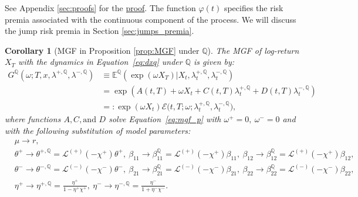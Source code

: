 \documentclass[11pt,a4paper]{article}
\numberwithin{equation}{section}
\newtheorem{corollary}[theorem]{Corollary}
\theoremstyle{remark}
\theoremstyle{definition}
\newcommand{\E}{{\mathbb{E}}}
\newcommand{\q}{{\mathbb Q}}
\newcommand{\lQp}{\lambda^{+,\q}}
\newcommand{\lQm}{\lambda^{-,\q}}
\newcommand{\Ec}{\mathcal{E}}
\begin{document}
See Appendix \ref{sec:proofs} for the \hyperref[proof:prop:risk-neutralisation]{proof}.
The function $\varphi(t)$ specifies the risk premia associated with the continuous component of the process. We will discuss the jump risk premia in Section \ref{sec:jumps_premia}.

\begin{corollary}[MGF in Proposition \ref{prop:MGF} under $\mathbb{Q}$] \label{prop:MGF_q}
    The MGF of log-return $X_T$ with the dynamics in Equation~\eqref{eq:dxq} under $\mathbb{Q}$ is given by:
    \begin{equation}\label{eq:mgf_q}
    \begin{split}
        G^{\mathbb{Q}}(\omega;T,x,\lambda^{+, \mathbb{Q}}, \lambda^{-, \mathbb{Q}}) & \equiv\E^{\mathbb{Q}}\left(\exp(\omega X_T)\big|X_t, \lambda^{+, \mathbb{Q}}_t, \lambda^{-, \mathbb{Q}}_t\right)\\
        & = \exp\left(A(t,T)+ \omega X_t + C(t,T)\lambda_t^{+, \mathbb{Q}} + D(t,T)\lambda_t^{-, \mathbb{Q}}\right)\\
        & =: \exp\left(\omega X_t \right)\Ec\big(t,T;\omega;\lQp_t,\lQm_t\big), %
    \end{split}
    \end{equation}
    where functions $A, C,\text{and } D$ solve Equation~\eqref{eq:mgf_p} with $\omega^+=0, \ \omega^-=0$ and with the following substitution of model parameters:
\begin{equation}\label{eq:mgf_q1}
\begin{split}
& \mu \rightarrow r,\\
& \theta^{+} \rightarrow  \theta^{+, \mathbb{Q}} = \mathcal{L}^{(+)}(-\chi^+)\theta^+, \ \beta_{11} \rightarrow \beta^{\mathbb{Q}}_{11} = \mathcal{L}^{(+)}(-\chi^+)\beta_{11},\ \beta_{12}\rightarrow \beta^{\mathbb{Q}}_{12} = \mathcal{L}^{(+)}(-\chi^+)\beta_{12},\\
& \theta^{-} \rightarrow \theta^{-,\mathbb{Q}} = \mathcal{L}^{(-)}(-\chi^-)\theta^-, \  \beta_{21}\rightarrow \beta^{\mathbb{Q}}_{21} = \mathcal{L}^{(-)}(-\chi^-)\beta_{21}, \ \beta_{22} \rightarrow \beta^{\mathbb{Q}}_{22} = \mathcal{L}^{(-)}(-\chi^-)\beta_{22},\\
& \eta^{+} \rightarrow  \eta^{+,\mathbb{Q}} =  \frac{\eta^+}{1-\eta^+\chi^+},\ \eta^{-}\rightarrow \eta^{-,\mathbb{Q}}   = \frac{\eta^-}{1+\eta^-\chi^-}.
\end{split}
\end{equation}
\end{corollary}
\end{document}
